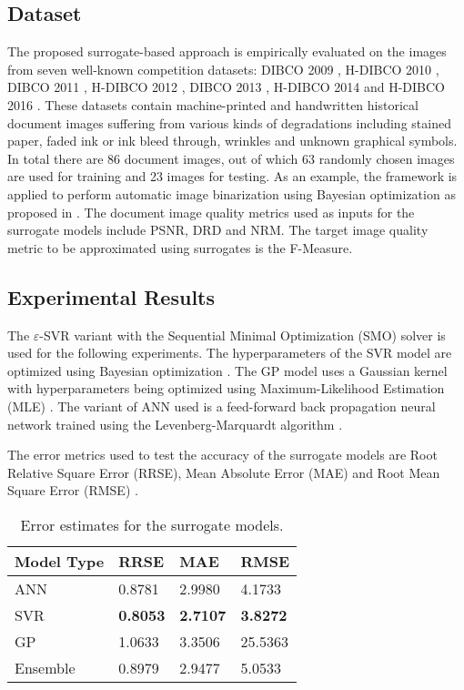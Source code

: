 \documentclass[10pt, a4paper, conference, compsocconf]{IEEEtran}
\begin{document}
\subsection{Dataset}
The proposed surrogate-based approach is empirically evaluated on the images from seven well-known competition datasets: DIBCO 2009 \cite{gatos2009icdar}, H-DIBCO 2010 \cite{pratikakis2010h}, DIBCO 2011 \cite{gatos2011icdar2}, H-DIBCO 2012 \cite{pratikakis2012icfhr}, DIBCO 2013 \cite{pratikakis2013icdar}, H-DIBCO 2014 \cite{ntirogiannis2014icfhr2014} and H-DIBCO 2016 \cite{pratikakis2016icfhr2016}. These datasets contain machine-printed and handwritten historical document images suffering from various kinds of degradations including stained paper, faded ink or ink bleed through, wrinkles and unknown graphical symbols. In total there are 86 document images, out of which 63 randomly chosen images are used for training and 23 images for testing. As an example, the framework is applied to perform automatic image binarization using Bayesian optimization as proposed in \cite{vats2017automatic}. The document image quality metrics used as inputs for the surrogate models include PSNR, DRD and NRM. The target image quality metric to be approximated using surrogates is the F-Measure.




\subsection{Experimental Results}
The $\varepsilon$-SVR variant \cite{basak2007support} with the Sequential Minimal Optimization (SMO) \cite{platt1998sequential} solver is used for the following experiments. The hyperparameters of the SVR model are optimized using Bayesian optimization \cite{snoek2012practical}. The GP model uses a Gaussian kernel with hyperparameters being optimized using Maximum-Likelihood Estimation (MLE) \cite{rasmussen2006gaussian}. The variant of ANN used is a feed-forward back propagation neural network \cite{haykin2009neural} trained using the Levenberg-Marquardt algorithm \cite{demuth2014neural}.

The error metrics used to test the accuracy of the surrogate models are Root Relative Square Error (RRSE), Mean Absolute Error (MAE) and Root Mean Square Error (RMSE) \cite{graczyk2009comparative}.






\begin{table}[!t]
\centering
\caption{Error estimates for the surrogate models.\label{tab:resB}}
\begin{tabular}{p{1.5cm}p{1.5cm}p{1.5cm}p{1cm}}
\hline
Model Type & RRSE & MAE & RMSE \\ \hline
ANN & 0.8781 & 2.9980 & 4.1733 \\
SVR & {\bf 0.8053} & {\bf 2.7107} & {\bf 3.8272}\\
GP & 1.0633 & 3.3506 & 25.5363 \\
Ensemble & 0.8979 & 2.9477 & 5.0533 \\
\hline
\end{tabular}
\end{table}
\end{document}
